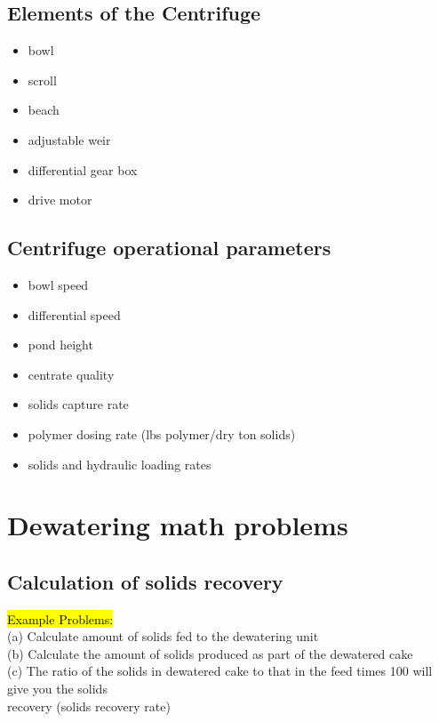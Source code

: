 \subsection{Elements of the Centrifuge}	


					\begin{itemize}
						\item bowl
						\item scroll
						\item beach
						\item adjustable weir
						\item differential gear box
						\item drive motor
					\end{itemize}

\subsection{Centrifuge operational parameters}	
					\begin{itemize}
						\item bowl speed
						\item differential speed
						\item pond height
						\item centrate quality
						\item solids capture rate
						\item polymer dosing rate (lbs polymer/dry ton solids)
						\item solids and hydraulic loading rates
					\end{itemize}

\section{Dewatering math problems}

\subsection{Calculation of solids recovery}



                \hl{Example Problems:}\\


(a) Calculate amount of solids fed to the dewatering unit\\
(b) Calculate the amount of solids produced as part of the dewatered cake\\
(c) The ratio of the solids in dewatered cake to that in the feed times 100 will give you the solids\\
recovery (solids recovery rate)\\


